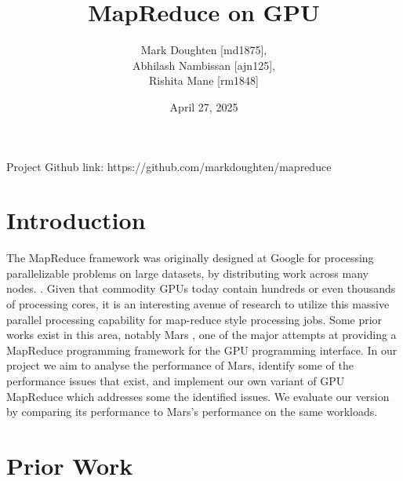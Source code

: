 \documentclass{article}
\title{MapReduce on GPU}
\author{Mark Doughten [md1875], \\ Abhilash Nambissan [ajn125], \\ Rishita Mane [rm1848]}
\date{April 27, 2025}
\begin{document}
\maketitle

Project Github link: https://github.com/markdoughten/mapreduce


\section{Introduction}
The MapReduce framework was originally designed at Google for processing  parallelizable problems on large datasets, by distributing work across many nodes. \cite{mapreduce}. Given that commodity GPUs today contain hundreds or even thousands of processing cores, it is an interesting avenue of research to utilize this massive parallel processing capability for map-reduce style processing jobs. Some prior works exist in this area, notably Mars \cite{mars}, one of the major attempts at providing a MapReduce programming framework for the GPU programming interface. In our project we aim to analyse the performance of Mars, identify some of the performance issues that exist, and implement our own variant of GPU MapReduce which addresses some the identified issues. We evaluate our version by comparing its performance to Mars's performance on the same workloads. 

\section{Prior Work}
\end{document}
